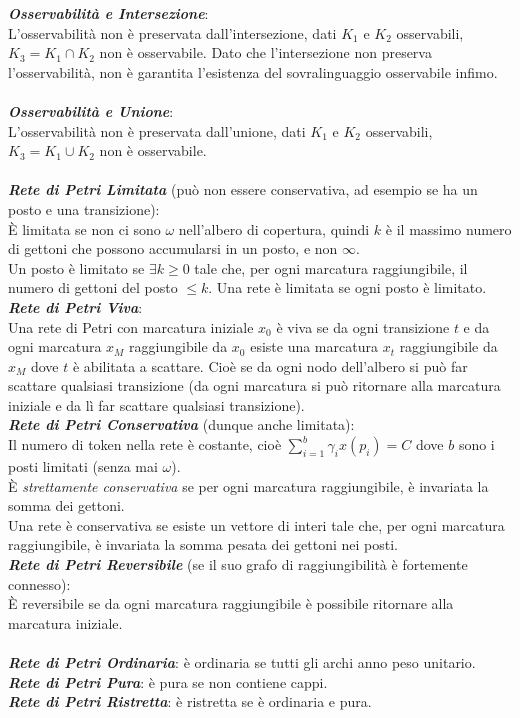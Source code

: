 \documentclass[a4paper, notitlepage, 10pt]{report}
\begin{document}
\textit{\textbf{Osservabilità e Intersezione}}:\\
L'osservabilità non è preservata dall'intersezione, dati $K_1$ e $K_2$ osservabili, $K_3 = K_1 \cap K_2$ non è osservabile.
Dato che l'intersezione non preserva l'osservabilità, non è garantita l'esistenza del sovralinguaggio osservabile infimo.
\\\\
\textit{\textbf{Osservabilità e Unione}}:\\
L'osservabilità non è preservata dall'unione, dati $K_1$ e $K_2$ osservabili, $K_3 = K_1 \cup K_2$ non è osservabile.
\\\\
\textit{\textbf{Rete di Petri Limitata}} (può non essere conservativa, ad esempio se ha un posto e una transizione):\\
È limitata se non ci sono $\omega$ nell'albero di copertura, quindi $k$ è il massimo numero di gettoni che possono accumularsi in un posto, e non $\infty$.\\
Un posto è limitato se $\exists k \geq 0$ tale che, per ogni marcatura raggiungibile, il numero di gettoni del posto $\leq k$. Una rete è limitata se ogni posto è limitato.
\\
\textit{\textbf{Rete di Petri Viva}}:\\
Una rete di Petri con marcatura iniziale $x_0$ è viva se da ogni transizione $t$ e da ogni marcatura $x_M$ raggiungibile da $x_0$ esiste una marcatura $x_t$ raggiungibile da $x_M$ dove $t$ è abilitata a scattare. Cioè se da ogni nodo dell'albero si può far scattare qualsiasi transizione (da ogni marcatura si può ritornare alla marcatura iniziale e da lì far scattare qualsiasi transizione).
\\
\textit{\textbf{Rete di Petri Conservativa}} (dunque anche limitata):\\
Il numero di token nella rete è costante, cioè $\sum_{i=1}^{b} \gamma_i x(p_i) = C$ dove $b$ sono i posti limitati (senza mai $\omega$).\\
\MakeUppercase{è} \textit{strettamente conservativa} se per ogni marcatura raggiungibile, è invariata la somma dei gettoni.\\
Una rete è conservativa se esiste un vettore di interi tale che, per ogni marcatura raggiungibile, è invariata la somma pesata dei gettoni nei posti.
\\
\textit{\textbf{Rete di Petri Reversibile}} (se il suo grafo di raggiungibilità è fortemente connesso):\\
È reversibile se da ogni marcatura raggiungibile è possibile ritornare alla marcatura iniziale.
\\\\
\textit{\textbf{Rete di Petri Ordinaria}}: è ordinaria se tutti gli archi anno peso unitario.
\\
\textit{\textbf{Rete di Petri Pura}}: è pura se non contiene cappi.
\\
\textit{\textbf{Rete di Petri Ristretta}}: è ristretta se è ordinaria e pura.
\end{document}
